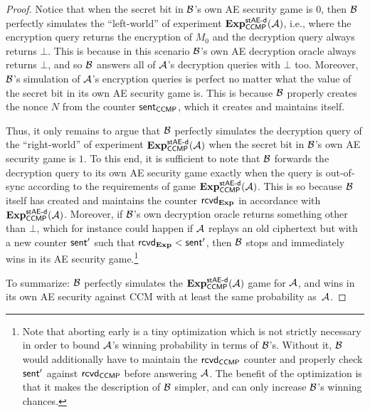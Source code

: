 \begin{proof}
Notice that when the secret bit in $\A[B]$'s own AE security game is $0$,
then $\A[B]$ perfectly simulates the ``left-world'' of experiment $\Exp_{\ccmp}^{\staesecd}(\A)$,
i.e., where the encryption query returns the encryption of $M_0$ and the decryption query always returns $\bot$.
This is because in this scenario $\A[B]$'s own AE decryption oracle always returns $\bot$,
and so $\A[B]$ answers all of $\A$'s decryption queries with $\bot$ too.
Moreover,
$\A[B]$'s simulation of $\A$'s encryption queries is perfect no matter what the value of the secret bit in its own AE security game is.
This is because $\A[B]$ properly creates the nonce $N$ from the counter $\sent_\ccmp$,
which it creates and maintains itself.


Thus,
it only remains to argue that $\A[B]$ perfectly simulates the decryption query of the ``right-world'' of experiment $\Exp_{\ccmp}^{\staesecd}(\A)$
when the secret bit in $\A[B]$'s own AE security game is $1$.
To this end,
it is sufficient to note that $\A[B]$ forwards the decryption query to its own AE security game exactly when the query is out-of-sync according to the requirements of game $\Exp_{\ccmp}^{\staesecd}(\A)$.
This is so because $\A[B]$ itself has created and maintains the counter $\received_\Exp$ in accordance with $\Exp_{\ccmp}^{\staesecd}(\A)$.
Moreover,
if $\A[B]$'s own decryption oracle returns something other than $\bot$,
which for instance could happen if $\A$ replays an old ciphertext but with a new counter $\sent'$ such that $\received_\Exp < \sent'$,
then $\A[B]$ stops and immediately wins in its AE security game.\footnote{Note
that aborting early is a tiny optimization which is not strictly necessary in order to bound $\A$'s winning probability in terms of $\A[B]$'s.
Without it,
$\A[B]$ would additionally have to maintain the $\received_\ccmp$ counter and properly check $\sent'$ against $\received_\ccmp$ before answering $\A$.
The benefit of the optimization is that it makes the description of $\A[B]$ simpler,
and can only increase $\A[B]$'s winning chances. 
}

To summarize:
$\A[B]$ perfectly simulates the $\Exp_{\ccmp}^{\staesecd}(\A)$ game for $\A$,
and wins in its own AE security against CCM with at least the same probability as~$\A$.
\end{proof}

